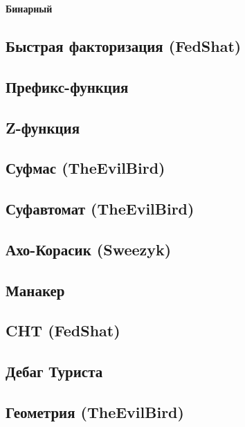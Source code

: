 \documentclass[a4paper]{article}
\begin{document}
\begin{multicols*}{2}
            \textbf{Бинарный}
            
        
        \subsection{Быстрая факторизация (FedShat)}
            

        \subsection{Префикс-функция}
            
            
        \subsection{Z-функция}
            
            
        \subsection{Суфмас (TheEvilBird)}
            
            
        \subsection{Суфавтомат (TheEvilBird)}
            
        
        \subsection{Ахо-Корасик (Sweezyk)}
            
            
        \subsection{Манакер}
            
            
        \subsection{CHT (FedShat)}
            
        
        \subsection{Дебаг Туриста}
            
        
        \subsection{Геометрия (TheEvilBird)}
            
    
\end{multicols*}
\end{document}

